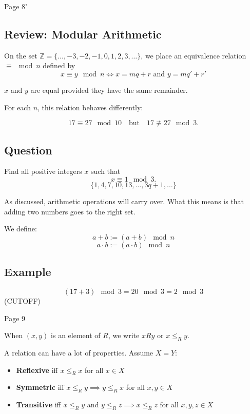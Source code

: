 \documentclass{article}
\begin{document}
\newpage
\begin{flushleft}
    Page 8'
\end{flushleft}

\subsection*{Review: Modular Arithmetic}

On the set $\mathbb{Z} = \{\ldots, -3, -2, -1, 0, 1, 2, 3, \ldots\}$, we place an equivalence relation $\equiv \mod n$ defined by 
\[ x \equiv y \mod n \iff x = mq + r \text{ and } y = mq' + r' \]

$x$ and $y$ are equal provided they have the same remainder.

For each $n$, this relation behaves differently:

\[ 17 \equiv 27 \mod 10 \quad \text{but} \quad 17 \not\equiv 27 \mod 3. \]

\subsection*{Question}
Find all positive integers $x$ such that 
\[ x \equiv 1 \mod 3. \]
\[ \{1, 4, 7, 10, 13, \ldots, 3q + 1, \ldots\} \]

As discussed, arithmetic operations will carry over. What this means is that adding two numbers goes to the right set. 

We define:
\[ a + b := (a + b) \mod n \]
\[ a \cdot b := (a \cdot b) \mod n \]

\subsection*{Example}
\[ (17 + 3) \mod 3 = 20 \mod 3 = 2 \mod 3 \]
(CUTOFF)


\newpage
\begin{flushleft}
    Page 9
\end{flushleft}

When $(x, y)$ is an element of $R$, we write $x R y$ or $x \leq_R y$.

A relation can have a lot of properties. Assume $X = Y$:
\begin{itemize}
    \item \textbf{Reflexive} iff $x \leq_R x$ for all $x \in X$
    \item \textbf{Symmetric} iff $x \leq_R y \implies y \leq_R x$ for all $x, y \in X$
    \item \textbf{Transitive} iff $x \leq_R y$ and $y \leq_R z \implies x \leq_R z$ for all $x, y, z \in X$
\end{itemize}
\end{document}

